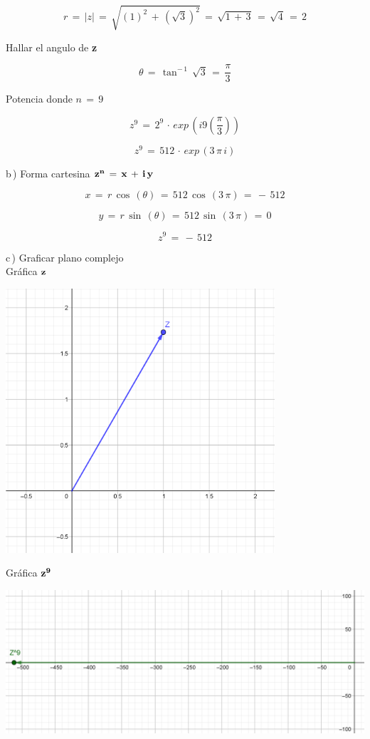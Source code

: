 \documentclass[a4paper,11pt,openany]{book}
\begin{document}
$$r\,=\,|z|\,=\,\sqrt{(1)^{2}\,+\,\left(\sqrt{3}\right)^{2}}\,=\,\sqrt{1\,+\,3}\,=\,\sqrt{4}\,=\,2$$

\textcolor{ao(english)}{} Hallar el angulo de \textbf{z}

$$\theta\,=\,\tan^{-\,1}\,\sqrt{3}\,=\,\dfrac{\pi}{3}$$

\textcolor{ao(english)}{} Potencia donde $n\,=\,9$

$$z^{9}\,=\,2^{9}\,\cdot\,exp\,\left(i9\left(\dfrac{\pi}{3}\right)\right)$$

$$z^{9}\,=\,512\,\cdot\,exp\,\left(3\,\pi\,i\right)$$

\textcolor{ao(english)}{b\,)} Forma cartesina $\bf{z^{n}\,=\,x\,+\,i\,y}$

$$x\,=\,r\,\cos\,(\theta)\,=\,512\,\cos\,(3\,\pi)\,=\,-\,512$$

$$y\,=\,r\,\sin\,(\theta)\,=\,512\,\sin\,(3\,\pi)\,=\,0$$

$$z^{9}\,=\,-\,512$$

\newpage

\textcolor{ao(english)}{c\,)} Graficar plano complejo\\

\textcolor{ao(english)}{} Gráfica $\bf{z}$

\begin{center}
    \includegraphics[width=10cm]{Gra-Ej-7-1.png}
\end{center}

\textcolor{ao(english)}{} Gráfica $\bf{z^{9}}$

\begin{center}
    \includegraphics[width=15cm]{Gra-Ej-7-2.png}
\end{center}
\end{document}
